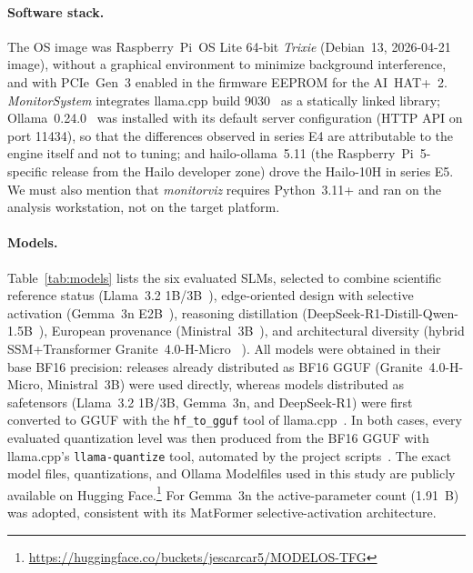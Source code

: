 \documentclass[acmsmall,natbib=false]{acmart}
\begin{document}
\paragraph{Software stack.}
The OS image was Raspberry~Pi~OS Lite 64-bit \emph{Trixie} (Debian~13,
2026-04-21 image), without a graphical environment to minimize background
interference, and with PCIe~Gen~3 enabled in the firmware EEPROM for the
AI~HAT+~2. \textit{MonitorSystem} integrates llama.cpp build
9030~\cite{gerganov_llamacpp_2023} as a statically linked library;
Ollama~0.24.0~\cite{ollama_2023} was installed with its default server
configuration (HTTP API on port 11434), so that the differences observed in
series E4 are attributable to the engine itself and not to tuning; and
hailo-ollama~5.11 (the Raspberry~Pi~5-specific release from the Hailo
developer zone) drove the Hailo-10H in series E5. We must also mention that 
\textit{monitorviz} requires Python~3.11+ and ran on the analysis workstation, 
not on the target platform.

\paragraph{Models.}
Table~\ref{tab:models} lists the six evaluated SLMs, selected to combine
scientific reference status (Llama~3.2 1B/3B~\cite{Llama32_1B_Instruct,
Llama32_3B_Instruct}), edge-oriented design with selective activation
(Gemma~3n E2B~\cite{Gemma3nE2B}), reasoning distillation
(DeepSeek-R1-Distill-Qwen-1.5B~\cite{DeepSeekR1DistillQwen15B}), European
provenance (Ministral~3B~\cite{Ministral33BInstruct2512GGUF}), and
architectural diversity (hybrid SSM+Transformer Granite~4.0-H-Micro
~\cite{Granite4HMicroGGUF}). All models were obtained in their base BF16
precision: releases already distributed as BF16 GGUF (Granite~4.0-H-Micro,
Ministral~3B) were used directly, whereas models distributed as safetensors
(Llama~3.2 1B/3B, Gemma~3n, and DeepSeek-R1) were first converted to GGUF with
the \texttt{hf\_to\_gguf} tool of llama.cpp~\cite{gerganov_llamacpp_2023}. In
both cases, every evaluated quantization level was then produced from the
BF16 GGUF with llama.cpp's \texttt{llama-quantize} tool, automated by the
project scripts~\cite{carrascosa_carro_tfg-yisusccscripts_2026}. The exact
model files, quantizations, and Ollama Modelfiles used in this study are
publicly available on Hugging
Face.\footnote{\url{https://huggingface.co/buckets/jescarcar5/MODELOS-TFG}}
For Gemma~3n the active-parameter count (1.91~B) was adopted, consistent with
its MatFormer selective-activation architecture.
\end{document}
